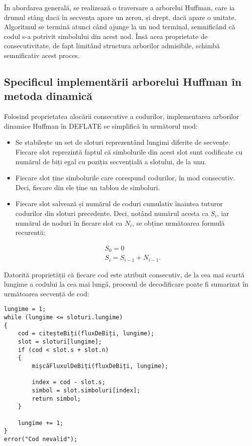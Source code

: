 \documentclass[a4paper,12pt]{report}
\begin{document}
În abordarea generală, se realizează o traversare a arborelui Huffman,
care ia drumul stâng dacă în secvența apare un zerou, și drept, dacă apare o unitate.
Algoritmul se termină atunci când ajunge la un nod terminal,
semnificând că codul s-a potrivit simbolului din acest nod.
Însă acea proprietate de consecutivitate,
de fapt limitând structura arborilor admisibile,
schimbă semnificativ acest proces.

\subsection{Specificul implementării arborelui Huffman în metoda dinamică}

Folosind proprietatea alocării consecutive a codurilor,
implementarea arborilor dinamice Huffman în DEFLATE se simplifică în următorul mod:
\begin{itemize}
    \item 
        Se stabilește un set de sloturi reprezentând lungimi diferite de secvențe.
        Fiecare slot reprezintă faptul că simbolurile din acest slot
        sunt codificate cu numărul de biți egal cu poziția secvențială a slotului, de la unu.
    \item
        Fiecare slot ține simbolurile care corespund codurilor, în mod consecutiv.
        Deci, fiecare din ele ține un tablou de simboluri.
    \item
        Fiecare slot salvează și numărul de coduri cumulativ înaintea tuturor codurilor din sloturi precedente.
        Deci, notând numărul acesta ca \( S_i \), iar numărul de noduri în fiecare slot ca \( N_i \),
        se obține următoarea formulă recurentă:

        \begin{gather*}
            S_0 = 0 \\
            S_i = S_{i - 1} + N_{i - 1}.
        \end{gather*}
\end{itemize}

Datorită proprietății că fiecare cod este atribuit consecutiv,
de la cea mai scurtă lungime a codului la cea mai lungă,
procesul de decodificare poate fi sumarizat în următoarea secvență de cod:

\begin{verbatim}
lungime = 1;
while (lungime <= sloturi.lungime)
{
    cod = citeșteBiți(fluxDeBiți, lungime);
    slot = sloturi[lungime];
    if (cod < slot.s + slot.n)
    {
        mișcăFluxulDeBiți(fluxDeBiți, lungime);

        index = cod - slot.s;
        simbol = slot.simboluri[index];
        return simbol;
    }

    lungime += 1;
}
error("Cod nevalid");
\end{verbatim}
\end{document}
